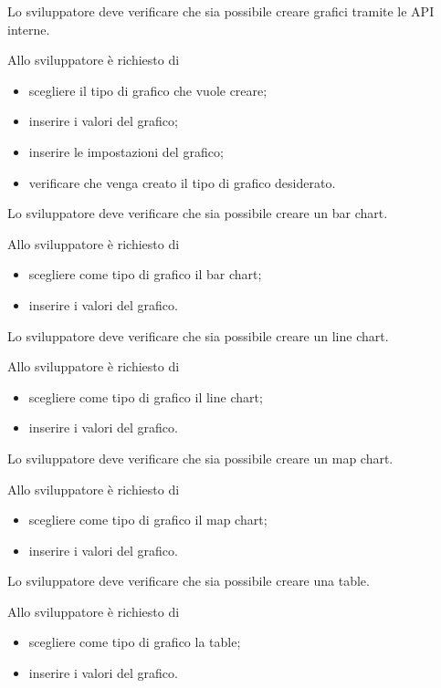 	Lo sviluppatore deve verificare che sia possibile creare grafici tramite le API interne.
	 
		Allo sviluppatore è richiesto di
		\begin{itemize}
			\item scegliere il tipo di grafico che vuole creare;
			\item inserire i valori del grafico;
			\item inserire le impostazioni del grafico;
			\item verificare che venga creato il tipo di grafico desiderato.
		\end{itemize}

	Lo sviluppatore deve verificare che sia possibile creare un bar chart.

		Allo sviluppatore è richiesto di
		\begin{itemize}
			\item scegliere come tipo di grafico il bar chart;
			\item inserire i valori del grafico.
		\end{itemize}

	Lo sviluppatore deve verificare che sia possibile creare un line chart.

		Allo sviluppatore è richiesto di
		\begin{itemize}
			\item scegliere come tipo di grafico il line chart;
			\item inserire i valori del grafico.
		\end{itemize}

	Lo sviluppatore deve verificare che sia possibile creare un map chart.

		Allo sviluppatore è richiesto di
		\begin{itemize}
			\item scegliere come tipo di grafico il map chart;
			\item inserire i valori del grafico.
		\end{itemize}

	Lo sviluppatore deve verificare che sia possibile creare una table.

		Allo sviluppatore è richiesto di
		\begin{itemize}
			\item scegliere come tipo di grafico la table;
			\item inserire i valori del grafico.
		\end{itemize}

